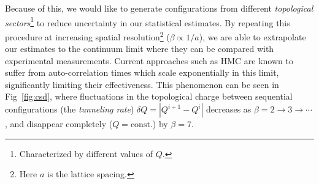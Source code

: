 \documentclass[a4paper,11pt]{article}
\begin{document}
Because of this, we would like to generate configurations from different
\textit{topological sectors}\footnote{Characterized by different values of $Q$.}
to reduce uncertainty in our statistical estimates.
%
By repeating this procedure at increasing spatial resolution\footnote{Here $a$ is the lattice spacing.} ($\beta \propto 1
/ a$), we are able to extrapolate our
estimates to the continuum limit where they can be compared with experimental
measurements.
%
Current approaches such as HMC are known to suffer from auto-correlation times
which scale exponentially in this limit, significantly limiting their
effectiveness.
%
This phenomenon can be seen in Fig~\ref{fig:csd}, where fluctuations in the
topological charge between sequential configurations (the \emph{tunneling rate}) $\delta Q = |Q^{i + 1} - Q^{i}|$ decreases as $\beta= 2
\rightarrow 3 \rightarrow \cdots$, and disappear completely ($Q =
\mathrm{const.}$) by $\beta = 7$.
%
%
\end{document}
